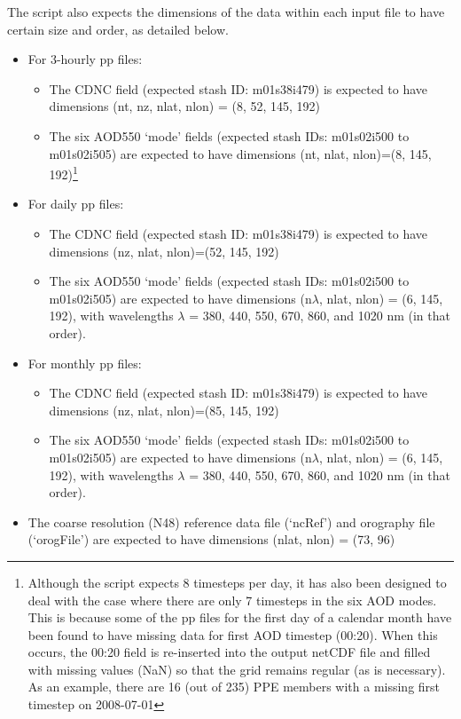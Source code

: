 \documentclass[10pt,a4paper]{article}
\begin{document}
\noindent The script also expects the dimensions of the data within each input file to have certain size and order, as detailed below.
\begin{itemize}
\item For 3-hourly pp files:
\begin{itemize}
\item The CDNC field (expected stash ID: m01s38i479) is expected to have dimensions (nt, nz, nlat, nlon) = (8, 52, 145, 192)
\item The six AOD550 `mode' fields (expected stash IDs: m01s02i500 to m01s02i505) are expected to have dimensions (nt, nlat, nlon)=(8, 145, 192)\footnote{Although the script expects 8 timesteps per day, it has also been designed to deal with the case where there are only 7 timesteps in the six AOD modes. This is because some of the pp files for the first day of a calendar month have been found to have missing data for first AOD timestep (00:20). When this occurs, the 00:20 field is re-inserted into the output netCDF file and filled with missing values (NaN) so that the grid remains regular (as is necessary). As an example, there are 16 (out of 235) PPE members with a missing first timestep on 2008-07-01}
\end{itemize}
\item For daily pp files:
\begin{itemize}
\item The CDNC field (expected stash ID: m01s38i479) is expected to have dimensions (nz, nlat, nlon)=(52, 145, 192)
\item The six AOD550 `mode' fields (expected stash IDs: m01s02i500 to m01s02i505) are expected to have dimensions (n$\lambda$, nlat, nlon) = (6, 145, 192), with wavelengths $\lambda$ = 380, 440, 550, 670, 860, and 1020 nm (in that order).
\end{itemize}
\item For monthly pp files:
\begin{itemize}
\item The CDNC field (expected stash ID: m01s38i479) is expected to have dimensions (nz, nlat, nlon)=(85, 145, 192)
\item The six AOD550 `mode' fields (expected stash IDs: m01s02i500 to m01s02i505) are expected to have dimensions (n$\lambda$, nlat, nlon) = (6, 145, 192), with wavelengths $\lambda$ = 380, 440, 550, 670, 860, and 1020 nm (in that order).
\end{itemize}
\item The coarse resolution (N48) reference data file (`ncRef') and orography file (`orogFile') are expected to have dimensions (nlat, nlon) = (73, 96)
\end{itemize}
\end{document}
